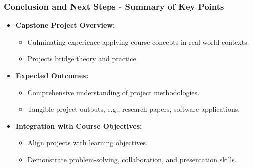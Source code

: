\documentclass[aspectratio=169]{beamer}
\begin{document}
\begin{frame}[fragile]
    \frametitle{Conclusion and Next Steps - Summary of Key Points}
    \begin{itemize}
        \item \textbf{Capstone Project Overview:}
            \begin{itemize}
                \item Culminating experience applying course concepts in real-world contexts.
                \item Projects bridge theory and practice.
            \end{itemize}
        \item \textbf{Expected Outcomes:}
            \begin{itemize}
                \item Comprehensive understanding of project methodologies.
                \item Tangible project outputs, e.g., research papers, software applications.
            \end{itemize}
        \item \textbf{Integration with Course Objectives:}
            \begin{itemize}
                \item Align projects with learning objectives.
                \item Demonstrate problem-solving, collaboration, and presentation skills.
            \end{itemize}
    \end{itemize}
\end{frame}
\end{document}
